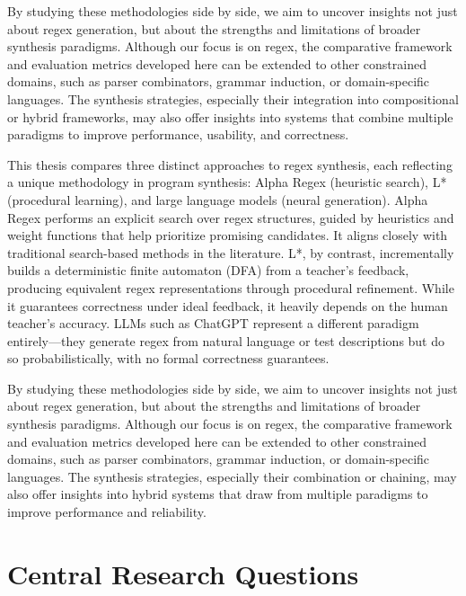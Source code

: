\indent\indent By studying these methodologies side by side, we aim to uncover insights not just about regex generation, but about the strengths and limitations of broader synthesis paradigms. Although our focus is on regex, the comparative framework and evaluation metrics developed here can be extended to other constrained domains, such as parser combinators, grammar induction, or domain-specific languages. The synthesis strategies, especially their integration into compositional or hybrid frameworks, may also offer insights into systems that combine multiple paradigms to improve performance, usability, and correctness.

\indent \indent This thesis compares three distinct approaches to regex synthesis, each reflecting a unique methodology in program synthesis: Alpha Regex (heuristic search), L* (procedural learning), and large language models (neural generation). Alpha Regex performs an explicit search over regex structures, guided by heuristics and weight functions that help prioritize promising candidates. It aligns closely with traditional search-based methods in the literature. L*, by contrast, incrementally builds a deterministic finite automaton (DFA) from a teacher's feedback, producing equivalent regex representations through procedural refinement. While it guarantees correctness under ideal feedback, it heavily depends on the human teacher's accuracy. LLMs such as ChatGPT represent a different paradigm entirely—they generate regex from natural language or test descriptions but do so probabilistically, with no formal correctness guarantees.

\indent \indent By studying these methodologies side by side, we aim to uncover insights not just about regex generation, but about the strengths and limitations of broader synthesis paradigms. Although our focus is on regex, the comparative framework and evaluation metrics developed here can be extended to other constrained domains, such as parser combinators, grammar induction, or domain-specific languages. The synthesis strategies, especially their combination or chaining, may also offer insights into hybrid systems that draw from multiple paradigms to improve performance and reliability.

\vspace{-0.4em}
\section{Central Research Questions}
\vspace{-0.4em}

